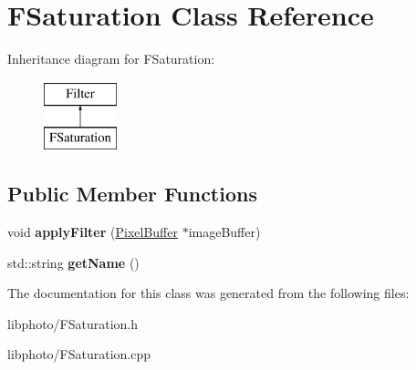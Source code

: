 \hypertarget{classFSaturation}{\section{F\-Saturation Class Reference}
\label{classFSaturation}
}
Inheritance diagram for F\-Saturation\-:\begin{figure}[H]
\begin{center}
\leavevmode
\includegraphics[height=2.000000cm]{classFSaturation}
\end{center}
\end{figure}
\subsection*{Public Member Functions}
\begin{DoxyCompactItemize}
\item 
\hypertarget{classFSaturation_a9e35fd05500411807bfcbe36b8f24a55}{void {\bfseries apply\-Filter} (\hyperlink{classPixelBuffer}{Pixel\-Buffer} $\ast$image\-Buffer)}\label{classFSaturation_a9e35fd05500411807bfcbe36b8f24a55}

\item 
\hypertarget{classFSaturation_a55d272a3a50fcb65d94a66821b7b0c73}{std\-::string {\bfseries get\-Name} ()}\label{classFSaturation_a55d272a3a50fcb65d94a66821b7b0c73}

\end{DoxyCompactItemize}


The documentation for this class was generated from the following files\-:\begin{DoxyCompactItemize}
\item 
libphoto/F\-Saturation.\-h\item 
libphoto/F\-Saturation.\-cpp\end{DoxyCompactItemize}
